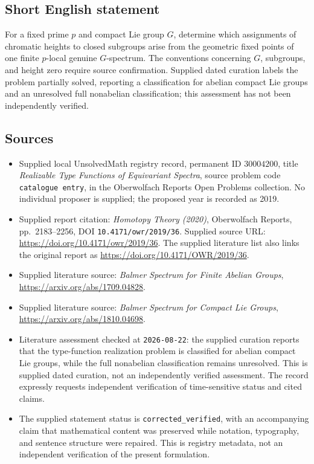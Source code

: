 \documentclass[11pt]{article}
\begin{document}
\subsection{Short English statement}
For a fixed prime \(p\) and compact Lie group \(G\), determine which assignments of chromatic heights to closed subgroups arise from the geometric fixed points of one finite \(p\)-local genuine \(G\)-spectrum. The conventions concerning \(G\), subgroups, and height zero require source confirmation. Supplied dated curation labels the problem partially solved, reporting a classification for abelian compact Lie groups and an unresolved full nonabelian classification; this assessment has not been independently verified.
\subsection{Sources}
\begin{itemize}
\item Supplied local UnsolvedMath registry record, permanent ID \(30004200\), title \emph{Realizable Type Functions of Equivariant Spectra}, source problem code \texttt{catalogue entry}, in the Oberwolfach Reports Open Problems collection. No individual proposer is supplied; the proposed year is recorded as 2019.
\item Supplied report citation: \emph{Homotopy Theory (2020)}, Oberwolfach Reports, pp.\ 2183--2256, DOI \texttt{10.4171/owr/2019/36}. Supplied source URL: \url{https://doi.org/10.4171/owr/2019/36}. The supplied literature list also links the original report as \url{https://doi.org/10.4171/OWR/2019/36}.
\item Supplied literature source: \emph{Balmer Spectrum for Finite Abelian Groups}, \url{https://arxiv.org/abs/1709.04828}.
\item Supplied literature source: \emph{Balmer Spectrum for Compact Lie Groups}, \url{https://arxiv.org/abs/1810.04698}.
\item Literature assessment checked at \texttt{2026-08-22}: the supplied curation reports that the type-function realization problem is classified for abelian compact Lie groups, while the full nonabelian classification remains unresolved. This is supplied dated curation, not an independently verified assessment. The record expressly requests independent verification of time-sensitive status and cited claims.
\item The supplied statement status is \texttt{corrected\_verified}, with an accompanying claim that mathematical content was preserved while notation, typography, and sentence structure were repaired. This is registry metadata, not an independent verification of the present formulation.
\end{itemize}
\end{document}
